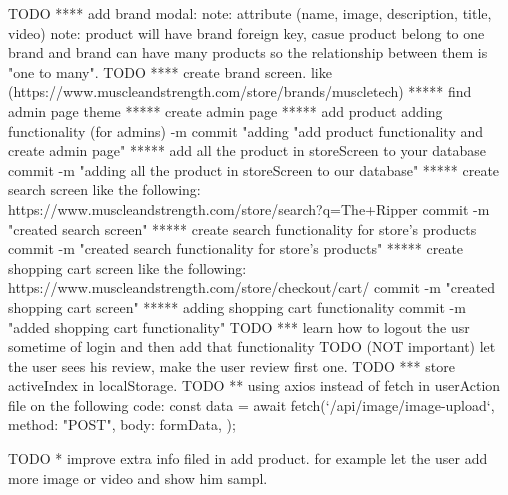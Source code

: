 {TODO **** add brand modal:
      note: attribute (name, image, description, title, video)
      note: product will have brand foreign key, casue product belong to one brand and brand can have many products
            so the relationship between them is "one to many".
TODO **** create brand screen. like (https://www.muscleandstrength.com/store/brands/muscletech) 
***** find admin page theme
***** create admin page
***** add product adding functionality (for admins)
    -m commit "adding "add product functionality and create admin page"
***** add all the product in storeScreen to your database
    commit -m "adding all the product in storeScreen to our database"
***** create search screen like the following: https://www.muscleandstrength.com/store/search?q=The+Ripper
      commit -m "created search screen"
***** create search functionality for store's products
      commit -m "created search functionality for store's products"
***** create shopping cart screen like the following:  https://www.muscleandstrength.com/store/checkout/cart/    
      commit -m "created shopping cart screen"
***** adding shopping cart functionality
          commit -m "added shopping cart functionality"
TODO *** learn how to logout the usr sometime of login and then add that functionality
TODO (NOT important) let the user sees his review, make the user review first one.
TODO *** store activeIndex in localStorage.
TODO ** using axios instead of fetch in userAction file on the following code: 
       const data = await fetch(`/api/image/image-upload`, {
      method: "POST",
      body: formData,
    });

TODO * improve extra info filed in add product. for example let the user add more image or video and show him sampl.

}
